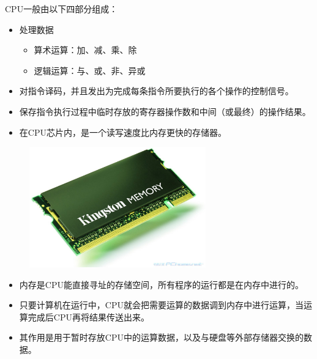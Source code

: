 \begin{frame}
 
CPU一般由以下四部分组成：
\begin{itemize}
\item  {} \quad 处理数据 
\begin{itemize}
\item 算术运算：加、减、乘、除 
\item 逻辑运算：与、或、非、异或
\end{itemize} 
\item  {}  \quad 对指令译码，并且发出为完成每条指令所要执行的各个操作的控制信号。\\[.1in]
\item  {}  \quad 保存指令执行过程中临时存放的寄存器操作数和中间（或最终）的操作结果。 

\item {} \quad 在CPU芯片内，是一个读写速度比内存更快的存储器。
\end{itemize}
\end{frame}
 
\begin{frame}
\begin{figure}
\centering
\includegraphics[width=3in]{ch01/fig/memory} 
\end{figure}
\end{frame}
 
\begin{frame}
\begin{itemize}
\item 内存是CPU能直接寻址的存储空间，所有程序的运行都是在内存中进行的。\\[0.1in]
\item
只要计算机在运行中，CPU就会把需要运算的数据调到内存中进行运算，当运算完成后CPU再将结果传送出来。\\[0.1in]
\item
其作用是用于暂时存放CPU中的运算数据，以及与硬盘等外部存储器交换的数据。\\[0.1in]
\end{itemize}
 \end{frame}
 
